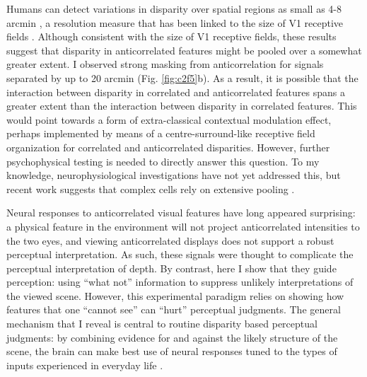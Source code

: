 Humans can detect variations in disparity over spatial regions as small as 4-8 arcmin \cite{Harris:1997kx,Banks:2004oh}, a resolution measure that has been linked to the size of V1 receptive fields \cite{Nienborg:2004ra}. Although consistent with the size of V1 receptive fields, these results suggest that disparity in anticorrelated features might be pooled over a somewhat greater extent. I observed strong masking from anticorrelation for signals separated by up to 20 arcmin (Fig. \ref{fig:c2f5}b). As a result, it is possible that the interaction between disparity in correlated and anticorrelated features spans a greater extent than the interaction between disparity in correlated features. This would point towards a form of extra-classical contextual modulation effect, perhaps implemented by means of a centre-surround-like receptive field organization for correlated and anticorrelated disparities. However, further psychophysical testing is needed to directly answer this question. To my knowledge, neurophysiological investigations have not yet addressed this, but recent work suggests that complex cells rely on extensive pooling \cite{Sasaki:2010pi,Kato:2016fk}.

Neural responses to anticorrelated visual features have long appeared surprising: a physical feature in the environment will not project anticorrelated intensities to the two eyes, and viewing anticorrelated displays does not support a robust perceptual interpretation. As such, these signals were thought to complicate the perceptual interpretation of depth. By contrast, here I show that they guide perception: using ``what not'' information to suppress unlikely interpretations of the viewed scene\cite{Goncalves:2017aa}. However, this experimental paradigm relies on showing how features that one ``cannot see'' can ``hurt'' perceptual judgments. The general mechanism that I reveal is central to routine disparity based perceptual judgments: by combining evidence for and against the likely structure of the scene, the brain can make best use of neural responses tuned to the types of inputs experienced in everyday life \cite{Goncalves:2017aa}.




